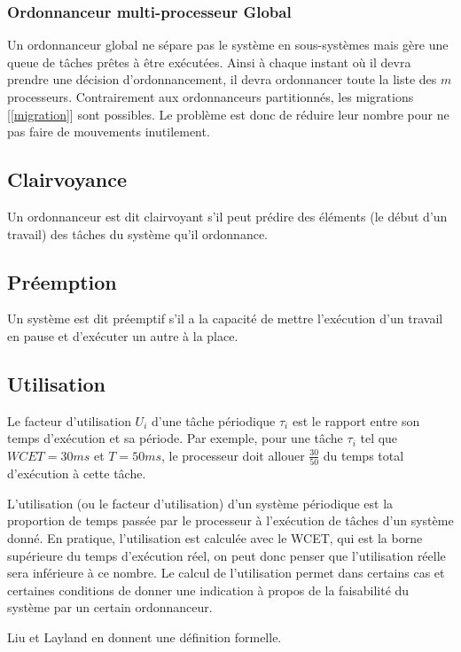 	\subsubsection{Ordonnanceur multi-processeur Global}
	Un ordonnanceur global ne sépare pas le système en sous-systèmes mais gère une 
	queue de tâches prêtes à être exécutées. Ainsi à chaque instant où il devra prendre une décision 
	d'ordonnancement, il devra ordonnancer toute la liste des $m$ processeurs.\medskip
	Contrairement aux ordonnanceurs partitionnés, les migrations [\ref{migration}] sont possibles. Le problème 
	est donc de réduire leur nombre pour ne pas faire de mouvements inutilement.
	
	\subsection{Clairvoyance}
	Un ordonnanceur est dit \og clairvoyant\fg{}  s'il peut prédire des éléments (le début d'un travail) des tâches du système qu'il ordonnance.
	
	\subsection{Préemption} 
	Un système est dit préemptif s'il a la capacité 
	de mettre l'exécution d'un travail en pause et d'exécuter un autre à la place. 
	
	\subsection{Utilisation}
	Le facteur d'utilisation $U_i$ d'une tâche périodique $\tau_i$ est le rapport entre 
	son temps d'exécution et sa période. Par exemple, pour une tâche $\tau_i$ tel que 
	$WCET = 30 ms$ et $T = 50 ms$, le processeur doit allouer $\frac{30}{50}$ du temps 
	total d'exécution à cette tâche.\medskip
	
	L'utilisation (ou le facteur d'utilisation) d'un système périodique est la proportion de temps 
	passée par le processeur à l'exécution de tâches d'un système donné. En pratique, l'utilisation 
	est calculée avec le WCET, qui est la borne supérieure du temps d'exécution réel, on 
	peut donc penser que l'utilisation réelle sera inférieure à ce nombre.
	Le calcul de l'utilisation permet dans certains cas et certaines conditions de donner une indication 
	à propos de la faisabilité du système par un certain ordonnanceur. 
	\medskip
	
	Liu et Layland \cite{liu_scheduling_1973} en donnent une définition formelle.\medskip 
	
